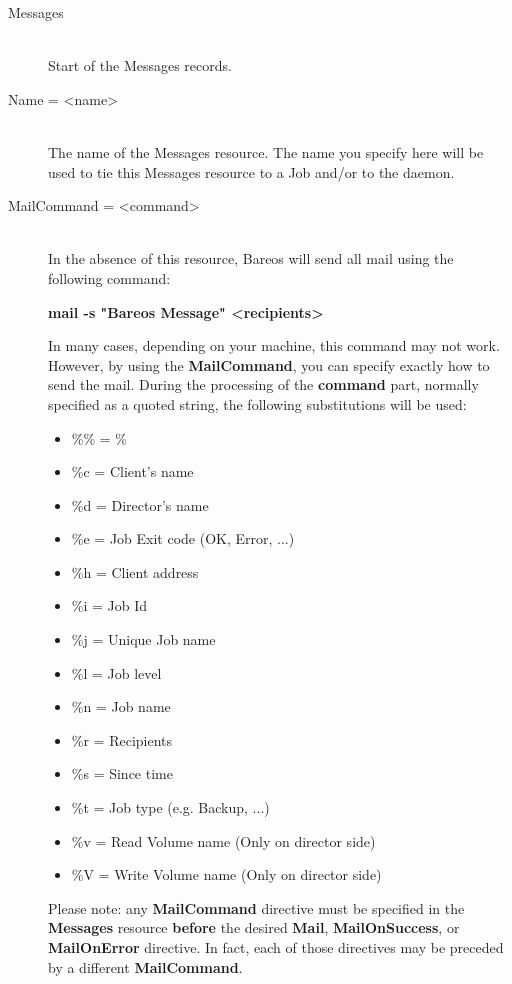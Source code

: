 \begin{description}

\item [Messages] \hfill \\
Start of the Messages records.

\item [Name = {\textless}name{\textgreater}] \hfill \\
The name of the Messages resource.  The name you specify here will be used to
tie this Messages  resource to a Job and/or to the daemon.

\label{mailcommand}
\item [MailCommand = {\textless}command{\textgreater}] \hfill \\
In the absence of this resource,  Bareos will send all mail using the
following command:

{\bf mail -s "Bareos Message" {\textless}recipients{\textgreater}}

In many cases, depending on your machine, this command may not work.
However, by using the {\bf MailCommand}, you can specify exactly how to
send the mail.  During the processing of the {\bf command} part, normally
specified as a quoted string, the following substitutions will be used:

\begin{itemize}
\item \%\% = \%
\item \%c = Client's name
\item \%d = Director's name
\item \%e = Job Exit code (OK, Error, ...)
\item \%h = Client address
\item \%i = Job Id
\item \%j = Unique Job name
\item \%l = Job level
\item \%n = Job name
\item \%r = Recipients
\item \%s = Since time
\item \%t = Job type (e.g. Backup, ...)
\item \%v = Read Volume name (Only on director side)
\item \%V = Write Volume name (Only on director side)
\end{itemize}

Please note: any {\bf MailCommand} directive must be specified
in the {\bf Messages} resource {\bf before} the desired
{\bf Mail}, {\bf MailOnSuccess}, or {\bf MailOnError}
directive. In fact, each of those directives may be preceded by
a different {\bf MailCommand}.


\end{description}
